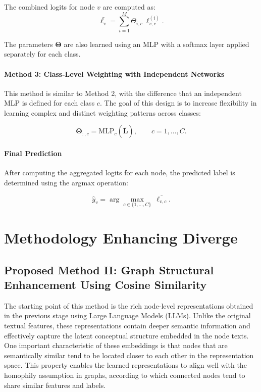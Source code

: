\documentclass{article}
\begin{document}
The combined logits for node $v$ are computed as:
\begin{equation}
\bar{\ell_{v}}=\sum_{i=1}^{M}\Theta_{i,c}\ \ell^{(i)}_{v,c}.
\end{equation}

The parameters $\mathbf{\Theta}$ are also learned using an MLP with a softmax layer applied separately for each class.

\paragraph{Method 3: Class-Level Weighting with Independent Networks}

This method is similar to Method 2, with the difference that an independent MLP is defined for each class $c$. The goal of this design is to increase flexibility in learning complex and distinct weighting patterns across classes:

\begin{equation}
\mathbf{\Theta}_{:,c}=\mathrm{MLP}_c(\bar{\mathbf{L}}), \qquad c=1,\dots,C.
\end{equation}

\paragraph{Final Prediction}

After computing the aggregated logits for each node, the predicted label is determined using the argmax operation:

\begin{equation}
\hat{y}_v=\arg\max_{c\in\{1,\dots,C\}}\ \bar{\ell_{v,c}}.
\end{equation}


\section{Methodology Enhancing Diverge}
\subsection{Proposed Method II: Graph Structural Enhancement Using Cosine Similarity}
The starting point of this method is the rich node-level representations obtained in the previous stage using Large Language Models (LLMs). Unlike the original textual features, these representations contain deeper semantic information and effectively capture the latent conceptual structure embedded in the node texts. One important characteristic of these embeddings is that nodes that are semantically similar tend to be located closer to each other in the representation space. This property enables the learned representations to align well with the homophily assumption in graphs, according to which connected nodes tend to share similar features and labels.
\end{document}
